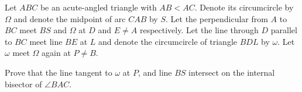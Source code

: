 Let $ABC$ be an acute-angled triangle with $AB < AC$. Denote its circumcircle by $\Omega$ and denote the midpoint of arc $CAB$ by $S$. Let the perpendicular from $A$ to $BC$ meet $BS$ and $\Omega$ at $D$ and $E \neq A$ respectively. Let the line through $D$ parallel to $BC$ meet line $BE$ at $L$ and denote the circumcircle of triangle $BDL$ by $\omega$. Let $\omega$ meet $\Omega$ again at $P \neq B$.

Prove that the line tangent to $\omega$ at $P$, and line $BS$ intersect on the internal bisector of $\angle BAC$.
